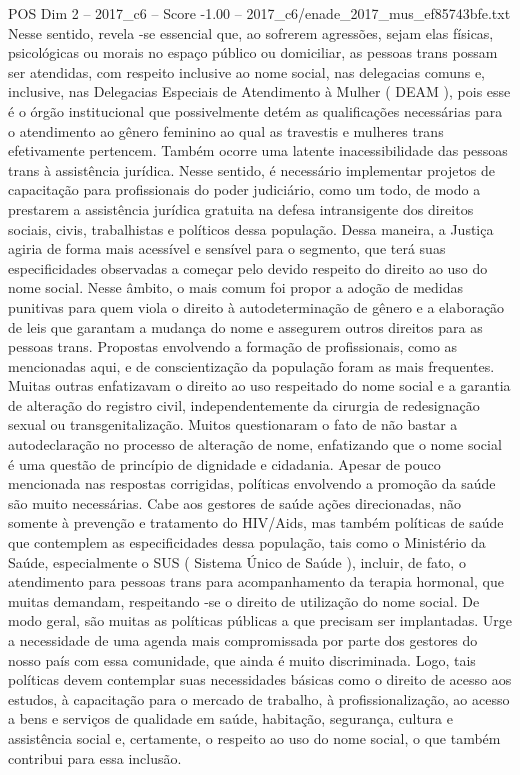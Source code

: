 \begin{textsample}{POS Dim 2 – 2017\_c6 – Score -1.00 – 2017\_c6/enade\_2017\_mus\_ef85743bfe.txt}
Nesse sentido, revela -se essencial que, ao sofrerem agressões, sejam elas físicas, psicológicas ou morais no espaço público ou domiciliar, as pessoas trans possam ser atendidas, com respeito inclusive ao nome social, nas delegacias comuns e, inclusive, nas Delegacias Especiais de Atendimento à Mulher ( DEAM ), pois esse é o órgão institucional que possivelmente detém as qualificações necessárias para o atendimento ao gênero feminino ao qual as travestis e mulheres trans efetivamente pertencem.
Também ocorre uma latente inacessibilidade das pessoas trans à assistência jurídica.
Nesse sentido, é necessário implementar projetos de capacitação para profissionais do poder judiciário, como um todo, de modo a prestarem a assistência jurídica gratuita na defesa intransigente dos direitos sociais, civis, trabalhistas e políticos dessa população.
Dessa maneira, a Justiça agiria de forma mais acessível e sensível para o segmento, que terá suas especificidades observadas a começar pelo devido respeito do direito ao uso do nome social.
Nesse âmbito, o mais comum foi propor a adoção de medidas punitivas para quem viola o direito à autodeterminação de gênero e a elaboração de leis que garantam a mudança do nome e assegurem outros direitos para as pessoas trans.
Propostas envolvendo a formação de profissionais, como as mencionadas aqui, e de conscientização da população foram as mais frequentes.
Muitas outras enfatizavam o direito ao uso respeitado do nome social e a garantia de alteração do registro civil, independentemente da cirurgia de redesignação sexual ou transgenitalização.
Muitos questionaram o fato de não bastar a autodeclaração no processo de alteração de nome, enfatizando que o nome social é uma questão de princípio de dignidade e cidadania.
Apesar de pouco mencionada nas respostas corrigidas, políticas envolvendo a promoção da saúde são muito necessárias.
Cabe aos gestores de saúde ações direcionadas, não somente à prevenção e tratamento do HIV/Aids, mas também políticas de saúde que contemplem as especificidades dessa população, tais como o Ministério da Saúde, especialmente o SUS ( Sistema Único de Saúde ), incluir, de fato, o atendimento para pessoas trans para acompanhamento da terapia hormonal, que muitas demandam, respeitando -se o direito de utilização do nome social.
De modo geral, são muitas as políticas públicas a que precisam ser implantadas.
Urge a necessidade de uma agenda mais compromissada por parte dos gestores do nosso país com essa comunidade, que ainda é muito discriminada.
Logo, tais políticas devem contemplar suas necessidades básicas como o direito de acesso aos estudos, à capacitação para o mercado de trabalho, à profissionalização, ao acesso a bens e serviços de qualidade em saúde, habitação, segurança, cultura e assistência social e, certamente, o respeito ao uso do nome social, o que também contribui para essa inclusão.

\end{textsample}
